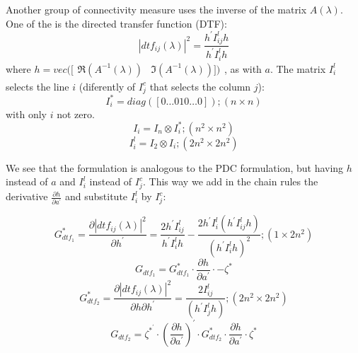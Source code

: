 \documentclass[a4paper,10pt]{article}
\begin{document}
Another group of connectivity measure uses the inverse of the matrix $A(\lambda)$. One of the is the directed transfer function (DTF):
\begin{equation}
 |dtf_{ij}(\lambda)|^{2} = \frac{h^{'} I_{ij}^{l} h}{h^{'} I_{i}^{l} h}
\end{equation}
where $h = vec([\begin{array}{cc}\Re(A^{-1}(\lambda)) & \Im(A^{-1}(\lambda))])\end{array}$, as with $a$. The matrix $I_{i}^{l}$ selects the line $i$ (diferently of $I_{j}^{c}$ that selects the column $j$):
\begin{equation}
I_{i}^{\ast} = diag([0 \dots 0 1 0 \dots 0]); (n \times n)
\end{equation}
with only $i$ not zero.
\begin{equation}
I_{i} = I_{n} \otimes I_{i}^{\ast}; (n^{2} \times n^{2})
\end{equation}
\begin{equation}
I_{i}^{l} = I_{2} \otimes I_{i}; (2n^{2} \times 2n^{2})
\end{equation}

We see that the formulation is analogous to the PDC formulation, but having $h$ instead of $a$ and $I_{i}^{l}$ instead of $I_{j}^{c}$. This way we add in the chain rules the derivative $\frac{\partial h}{\partial a^{'}}$ and substitute $I_{i}^{l}$ by $I_{j}^{c}$:

\begin{equation}
G_{dtf_{1}}^{\ast} = \frac{\partial |dtf_{ij}(\lambda)|^{2}} {\partial h^{'}} = \frac{2 h^{'} I_{ij}^{l}} {h^{'} I_{i}^{l} h} - \frac{2 h^{'} I_{i}^{l} (h^{'} I_{ij}^{l} h)} {(h^{'} I_{i}^{l} h)^{2}}; (1 \times 2n^{2})
\end{equation}
\begin{equation}
G_{dtf_{1}} = G_{dtf_{1}}^{\ast} \cdot \frac{\partial h}{\partial a^{'}} \cdot -\zeta^{\ast} 
\end{equation}
\begin{equation}
G_{dtf_{2}}^{\ast} = \frac{\partial |dtf_{ij}(\lambda)|^{2}} {\partial h \partial h^{'}} = \frac{2 I_{ij}^{l}}{(h^{'} I_{j}^{l} h)}; (2n^{2} \times 2n^{2})
\end{equation}
\begin{equation}
G_{dtf_{2}} = \zeta^{\ast^{'}} \cdot (\frac{\partial h}{\partial a^{'}})^{'} \cdot G_{dtf_{2}}^{\ast} \cdot \frac{\partial h}{\partial a^{'}} \cdot \zeta^{\ast}
\end{equation}
\end{document}
